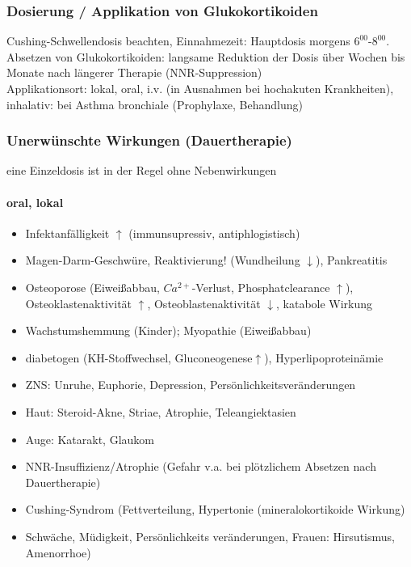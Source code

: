 \documentclass[10pt,a4paper]{report}
\begin{document}
\subsubsection{Dosierung / Applikation von Glukokortikoiden} %
\label{par:dosierung_applikation_von_glukokortikoiden}
Cushing-Schwellendosis beachten, Einnahmezeit: Hauptdosis morgens $6^{00}$-$8^{00}$.
Absetzen von Glukokortikoiden: langsame Reduktion der Dosis über Wochen bis Monate nach längerer Therapie (NNR-Suppression)\\
Applikationsort:  lokal, oral,  i.v. (in Ausnahmen bei hochakuten Krankheiten), inhalativ: bei Asthma bronchiale (Prophylaxe, Behandlung)
\subsubsection{Unerwünschte Wirkungen (Dauertherapie) } %
\label{par:unerw_nschte_wirkungen_dauertherapie_}
eine Einzeldosis ist in der Regel ohne Nebenwirkungen
\paragraph{oral, lokal} %
\label{subp:oral_lokal}
\begin{itemize}
	\item Infektanfälligkeit $\uparrow$ (immunsupressiv, antiphlogistisch)
	\item Magen-Darm-Geschwüre, Reaktivierung! (Wundheilung $\downarrow$), Pankreatitis
	\item Osteoporose (Eiweißabbau, $Ca^{2+}$-Verlust, Phosphatclearance $\uparrow$),   
	Osteoklastenaktivität $\uparrow$, Osteoblastenaktivität $\downarrow$, katabole Wirkung
	\item Wachstumshemmung (Kinder); Myopathie (Eiweißabbau)
	\item diabetogen (KH-Stoffwechsel, Gluconeogenese$\uparrow$), Hyperlipoproteinämie
	\item ZNS: Unruhe, Euphorie, Depression, Persönlichkeitsveränderungen
	\item Haut: Steroid-Akne, Striae, Atrophie, Teleangiektasien
	\item Auge: Katarakt, Glaukom
	\item NNR-Insuffizienz/Atrophie (Gefahr v.a. bei plötzlichem Absetzen nach Dauertherapie)
	\item Cushing-Syndrom (Fettverteilung, Hypertonie (mineralokortikoide Wirkung)
	\item Schwäche, Müdigkeit, Persönlichkeits veränderungen, Frauen: Hirsutismus, Amenorrhoe)
\end{itemize}
\end{document}
